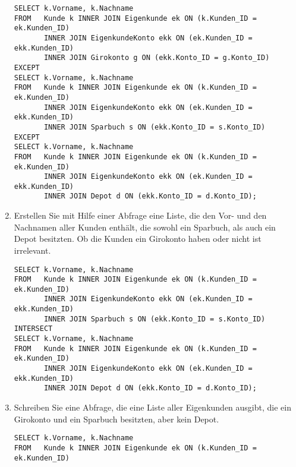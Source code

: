 \begin{enumerate}
\begin{lstlisting}[language=oracle_sql]
        \end{lstlisting}
\clearpage
        \begin{mssql}[\FALSE]
        \end{mssql}
        \begin{lstlisting}[language=ms_sql]
SELECT k.Vorname, k.Nachname
FROM   Kunde k INNER JOIN Eigenkunde ek ON (k.Kunden_ID = ek.Kunden_ID)
       INNER JOIN EigenkundeKonto ekk ON (ek.Kunden_ID = ekk.Kunden_ID)
       INNER JOIN Girokonto g ON (ekk.Konto_ID = g.Konto_ID)
EXCEPT
SELECT k.Vorname, k.Nachname
FROM   Kunde k INNER JOIN Eigenkunde ek ON (k.Kunden_ID = ek.Kunden_ID)
       INNER JOIN EigenkundeKonto ekk ON (ek.Kunden_ID = ekk.Kunden_ID)
       INNER JOIN Sparbuch s ON (ekk.Konto_ID = s.Konto_ID)
EXCEPT
SELECT k.Vorname, k.Nachname
FROM   Kunde k INNER JOIN Eigenkunde ek ON (k.Kunden_ID = ek.Kunden_ID)
       INNER JOIN EigenkundeKonto ekk ON (ek.Kunden_ID = ekk.Kunden_ID)
       INNER JOIN Depot d ON (ekk.Konto_ID = d.Konto_ID);
        \end{lstlisting}
        \item Erstellen Sie mit Hilfe einer Abfrage eine Liste, die den Vor- und
        den Nachnamen aller Kunden enthält, die sowohl ein Sparbuch, als auch
        ein Depot besitzten. Ob die Kunden ein Girokonto haben oder nicht ist
        irrelevant.
        \begin{msoraclesql}[\FALSE]
        \end{msoraclesql}
        \begin{lstlisting}[language=oracle_sql]
SELECT k.Vorname, k.Nachname
FROM   Kunde k INNER JOIN Eigenkunde ek ON (k.Kunden_ID = ek.Kunden_ID)
       INNER JOIN EigenkundeKonto ekk ON (ek.Kunden_ID = ekk.Kunden_ID)
       INNER JOIN Sparbuch s ON (ekk.Konto_ID = s.Konto_ID)
INTERSECT
SELECT k.Vorname, k.Nachname
FROM   Kunde k INNER JOIN Eigenkunde ek ON (k.Kunden_ID = ek.Kunden_ID)
       INNER JOIN EigenkundeKonto ekk ON (ek.Kunden_ID = ekk.Kunden_ID)
       INNER JOIN Depot d ON (ekk.Konto_ID = d.Konto_ID);
        \end{lstlisting}
        \item Schreiben Sie eine Abfrage, die eine Liste aller Eigenkunden
        ausgibt, die ein Girokonto und ein Sparbuch besitzten, aber kein Depot.
        \begin{oraclesql}[\FALSE]
        \end{oraclesql}
        \begin{lstlisting}[language=oracle_sql]
SELECT k.Vorname, k.Nachname
FROM   Kunde k INNER JOIN Eigenkunde ek ON (k.Kunden_ID = ek.Kunden_ID)

\end{lstlisting}
\end{enumerate}
